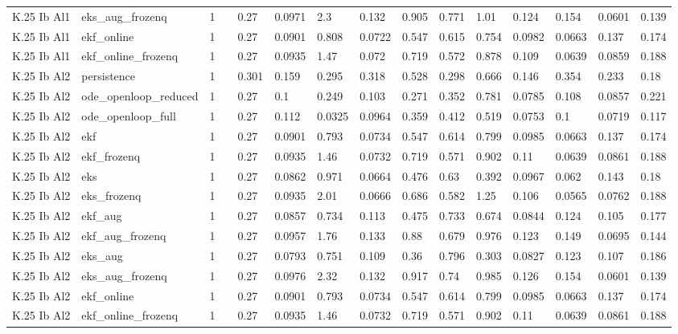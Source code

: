\begin{table}[t]
\begin{tabular}{lllllllllllllll}
K.25 Ib Al1 & eks\_aug\_frozenq & 1 &  & 0.27 & 0.0971 & 2.3 & 0.132 & 0.905 & 0.771 & 1.01 & 0.124 & 0.154 & 0.0601 & 0.139 \\
K.25 Ib Al1 & ekf\_online & 1 &  & 0.27 & 0.0901 & 0.808 & 0.0722 & 0.547 & 0.615 & 0.754 & 0.0982 & 0.0663 & 0.137 & 0.174 \\
K.25 Ib Al1 & ekf\_online\_frozenq & 1 &  & 0.27 & 0.0935 & 1.47 & 0.072 & 0.719 & 0.572 & 0.878 & 0.109 & 0.0639 & 0.0859 & 0.188 \\
K.25 Ib Al2 & persistence & 1 &  & 0.301 & 0.159 & 0.295 & 0.318 & 0.528 & 0.298 & 0.666 & 0.146 & 0.354 & 0.233 & 0.18 \\
K.25 Ib Al2 & ode\_openloop\_reduced & 1 &  & 0.27 & 0.1 & 0.249 & 0.103 & 0.271 & 0.352 & 0.781 & 0.0785 & 0.108 & 0.0857 & 0.221 \\
K.25 Ib Al2 & ode\_openloop\_full & 1 &  & 0.27 & 0.112 & 0.0325 & 0.0964 & 0.359 & 0.412 & 0.519 & 0.0753 & 0.1 & 0.0719 & 0.117 \\
K.25 Ib Al2 & ekf & 1 &  & 0.27 & 0.0901 & 0.793 & 0.0734 & 0.547 & 0.614 & 0.799 & 0.0985 & 0.0663 & 0.137 & 0.174 \\
K.25 Ib Al2 & ekf\_frozenq & 1 &  & 0.27 & 0.0935 & 1.46 & 0.0732 & 0.719 & 0.571 & 0.902 & 0.11 & 0.0639 & 0.0861 & 0.188 \\
K.25 Ib Al2 & eks & 1 &  & 0.27 & 0.0862 & 0.971 & 0.0664 & 0.476 & 0.63 & 0.392 & 0.0967 & 0.062 & 0.143 & 0.18 \\
K.25 Ib Al2 & eks\_frozenq & 1 &  & 0.27 & 0.0935 & 2.01 & 0.0666 & 0.686 & 0.582 & 1.25 & 0.106 & 0.0565 & 0.0762 & 0.188 \\
K.25 Ib Al2 & ekf\_aug & 1 &  & 0.27 & 0.0857 & 0.734 & 0.113 & 0.475 & 0.733 & 0.674 & 0.0844 & 0.124 & 0.105 & 0.177 \\
K.25 Ib Al2 & ekf\_aug\_frozenq & 1 &  & 0.27 & 0.0957 & 1.76 & 0.133 & 0.88 & 0.679 & 0.976 & 0.123 & 0.149 & 0.0695 & 0.144 \\
K.25 Ib Al2 & eks\_aug & 1 &  & 0.27 & 0.0793 & 0.751 & 0.109 & 0.36 & 0.796 & 0.303 & 0.0827 & 0.123 & 0.107 & 0.186 \\
K.25 Ib Al2 & eks\_aug\_frozenq & 1 &  & 0.27 & 0.0976 & 2.32 & 0.132 & 0.917 & 0.74 & 0.985 & 0.126 & 0.154 & 0.0601 & 0.139 \\
K.25 Ib Al2 & ekf\_online & 1 &  & 0.27 & 0.0901 & 0.793 & 0.0734 & 0.547 & 0.614 & 0.799 & 0.0985 & 0.0663 & 0.137 & 0.174 \\
K.25 Ib Al2 & ekf\_online\_frozenq & 1 &  & 0.27 & 0.0935 & 1.46 & 0.0732 & 0.719 & 0.571 & 0.902 & 0.11 & 0.0639 & 0.0861 & 0.188 \\

\end{tabular}
\end{table}
